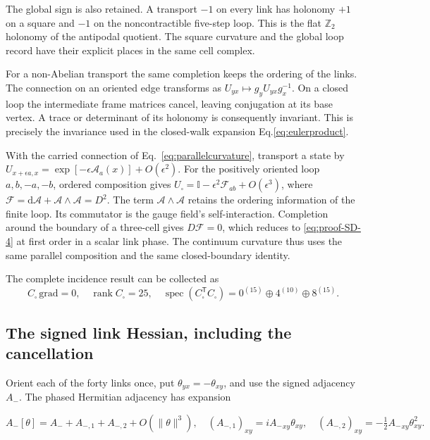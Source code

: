 \documentclass[aps,prx,onecolumn,10pt,notitlepage,nofootinbib,longbibliography]{revtex4-2}
\numberwithin{equation}{section}
\numberwithin{table}{section}
\newcommand{\Id}{\mathbb I}
\newcommand{\dd}{\mathrm d}
\begin{document}
The global sign is also retained. A transport \(-1\) on every link has holonomy \(+1\) on a square and \(-1\) on the noncontractible five-step loop. This is the flat \(\mathbb Z_2\) holonomy of the antipodal quotient. The square curvature and the global loop record have their explicit places in the same cell complex.

For a non-Abelian transport the same completion keeps the ordering of the links. The connection on an oriented edge transforms as \(U_{yx}\mapsto g_yU_{yx}g_x^{-1}\). On a closed loop the intermediate frame matrices cancel, leaving conjugation at its base vertex. A trace or determinant of its holonomy is consequently invariant. This is precisely the invariance used in the closed-walk expansion Eq.\eqref{eq:eulerproduct}.

With the carried connection of Eq.~\eqref{eq:parallelcurvature}, transport a state by $U_{x+\epsilon a,x}=\exp[-\epsilon\mathcal A_a(x)]+O(\epsilon^2)$. For the positively oriented loop $a,b,-a,-b$, ordered composition gives $U_\square=\Id-\epsilon^2\mathcal F_{ab}+O(\epsilon^3)$, where $\mathcal F=\dd\mathcal A+\mathcal A\wedge\mathcal A=D^2$. The term \(\mathcal A\wedge\mathcal A\) retains the ordering information of the finite loop. Its commutator is the gauge field's self-interaction. Completion around the boundary of a three-cell gives \(D\mathcal F=0\), which reduces to \eqref{eq:proof-SD-4} at first order in a scalar link phase. The continuum curvature thus uses the same parallel composition and the same closed-boundary identity.

The complete incidence result can be collected as
\begin{equation}
 C_\square\,\mathrm{grad}=0,\quad\operatorname{rank}C_\square=25,\quad
 \operatorname{spec}(C_\square^{\mathsf T}C_\square)
 =0^{(15)}\oplus4^{(10)}\oplus8^{(15)}.
 \label{eq:curlsi}
\end{equation}
\subsection{The signed link Hessian, including the cancellation}\label{the-signed-link-hessian-including-the-cancellation}

Orient each of the forty links once, put \(\theta_{yx}=-\theta_{xy}\), and use the signed adjacency \(A_-\). The phased Hermitian adjacency has expansion

\begin{equation}
 {A_-}[\theta]={A_-}+A_{-,1}+A_{-,2}+O(\|\theta\|^3),\quad
 (A_{-,1})_{xy}=i{A_-}_{xy}\theta_{xy},\quad
 (A_{-,2})_{xy}=-\tfrac12{A_-}_{xy}\theta_{xy}^2.
 \label{eq:proof-SCa-1}
\end{equation}
\end{document}
